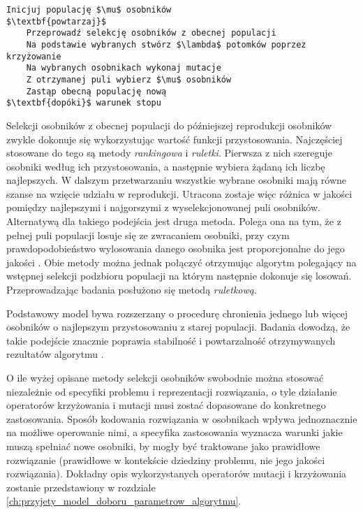 \begin{lstlisting}[caption=Podstawowy schemat algorytmu genetycznego, label=lst:genetic_algorithm_psedocode, mathescape]
Inicjuj populację $\mu$ osobników
$\textbf{powtarzaj}$
    Przeprowadź selekcję osobników z obecnej populacji
    Na podstawie wybranych stwórz $\lambda$ potomków poprzez krzyżowanie
    Na wybranych osobnikach wykonaj mutacje
    Z otrzymanej puli wybierz $\mu$ osobników
    Zastąp obecną populację nową
$\textbf{dopóki}$ warunek stopu
\end{lstlisting}
\par
Selekcji osobników z obecnej populacji do późniejszej reprodukcji osobników zwykle dokonuje się wykorzystując wartość funkcji przystosowania. Najczęściej stosowane do tego są metody \emph{rankingowa} i \emph{ruletki}. Pierwsza z nich szereguje osobniki według ich przystosowania, a następnie wybiera żądaną ich liczbę najlepszych. W dalszym przetwarzaniu wszystkie wybrane osobniki mają równe szanse na wzięcie udziału w reprodukcji. Utracona zostaje więc różnica w jakości pomiędzy najlepszymi i najgorszymi z wyselekcjonowanej puli osobników. Alternatywą dla takiego podejścia jest druga metoda. Polega ona na tym, że z pełnej puli populacji losuje się ze zwracaniem osobniki, przy czym prawdopodobieństwo wylosowania danego osobnika jest proporcjonalne do jego jakości \cite{sudholt2008computational}. Obie metody można jednak połączyć otrzymując algorytm polegający na wstępnej selekcji podzbioru populacji na którym następnie dokonuje się losowań. Przeprowadzając badania posłużono się metodą \emph{ruletkową}.
\par
Podstawowy model bywa rozszerzany o procedurę chronienia jednego lub więcej osobników o najlepszym przystosowaniu z starej populacji. Badania dowodzą, że takie podejście znacznie poprawia stabilność i powtarzalność otrzymywanych rezultatów algorytmu \cite{baluja1995removing}. 
\par
O ile wyżej opisane metody selekcji osobników swobodnie można stosować niezależnie od specyfiki problemu i reprezentacji rozwiązania, o tyle działanie operatorów krzyżowania i mutacji musi zostać dopasowane do konkretnego zastosowania. Sposób kodowania rozwiązania w osobnikach wpływa jednoznacznie na możliwe operowanie nimi, a specyfika zastosowania wyznacza warunki jakie muszą spełniać nowe osobniki, by mogły być traktowane jako prawidłowe rozwiązanie (prawidłowe w kontekście dziedziny problemu, nie jego jakości rozwiązania). Dokładny opis wykorzystanych operatorów mutacji i krzyżowania zostanie przedstawiony w rozdziale \ref{ch:przyjety_model_doboru_parametrow_algorytmu}.
\par

